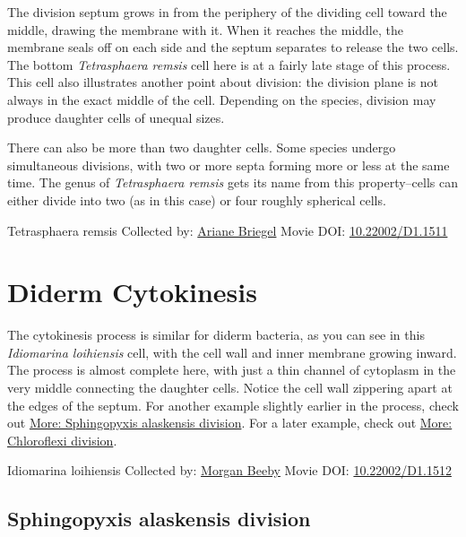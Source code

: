 \documentclass[]{tufte-book}
\begin{document}
The division septum grows in from the periphery of the dividing cell toward the middle, drawing the membrane with it. When it reaches the middle, the membrane seals off on each side and the septum separates to release the two cells. The bottom \emph{Tetrasphaera remsis} cell here is at a fairly late stage of this process. This cell also illustrates another point about division: the division plane is not always in the exact middle of the cell. Depending on the species, division may produce daughter cells of unequal sizes.

There can also be more than two daughter cells. Some species undergo simultaneous divisions, with two or more septa forming more or less at the same time. The genus of \emph{Tetrasphaera remsis} gets its name from this property--cells can either divide into two (as in this case) or four roughly spherical cells.



\hypertarget{htmlwidget-79e54868ef6efd8e463d}{}

\label{fig:5-5}Tetrasphaera remsis Collected by: \protect\hyperlink{ariane_briegel}{Ariane Briegel} Movie DOI: \href{https://doi.org/10.22002/D1.1511}{10.22002/D1.1511}

\hypertarget{diderm-cytokinesis}{%
\section{Diderm Cytokinesis}\label{diderm-cytokinesis}}

The cytokinesis process is similar for diderm bacteria, as you can see in this \emph{Idiomarina loihiensis} cell, with the cell wall and inner membrane growing inward. The process is almost complete here, with just a thin channel of cytoplasm in the very middle connecting the daughter cells. Notice the cell wall zippering apart at the edges of the septum. For another example slightly earlier in the process, check out \protect\hyperlink{Sphingopyxis_alaskensis_division}{More: Sphingopyxis alaskensis division}. For a later example, check out \protect\hyperlink{Chloroflexi_division}{More: Chloroflexi division}.



\hypertarget{htmlwidget-3c18de765f73f4e077c1}{}

\label{fig:5-6}Idiomarina loihiensis Collected by: \protect\hyperlink{morgan_beeby}{Morgan Beeby} Movie DOI: \href{https://doi.org/10.22002/D1.1512}{10.22002/D1.1512}

\hypertarget{Sphingopyxis_alaskensis_division}{%
\subsection{Sphingopyxis alaskensis division}\label{Sphingopyxis_alaskensis_division}}
\end{document}
